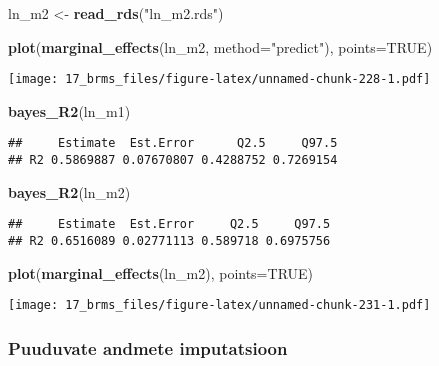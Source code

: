 \documentclass[]{article}
\newenvironment{Shaded}{\begin{snugshade}}{\end{snugshade}}
\newcommand{\KeywordTok}[1]{\textcolor[rgb]{0.13,0.29,0.53}{\textbf{#1}}}
\newcommand{\DataTypeTok}[1]{\textcolor[rgb]{0.13,0.29,0.53}{#1}}
\newcommand{\StringTok}[1]{\textcolor[rgb]{0.31,0.60,0.02}{#1}}
\newcommand{\OtherTok}[1]{\textcolor[rgb]{0.56,0.35,0.01}{#1}}
\newcommand{\NormalTok}[1]{#1}
\begin{document}
\begin{Shaded}
\begin{Highlighting}[]
\NormalTok{ln_m2 <-}\StringTok{ }\KeywordTok{read_rds}\NormalTok{(}\StringTok{"ln_m2.rds"}\NormalTok{)}
\end{Highlighting}
\end{Shaded}

\begin{Shaded}
\begin{Highlighting}[]
\KeywordTok{plot}\NormalTok{(}\KeywordTok{marginal_effects}\NormalTok{(ln_m2, }\DataTypeTok{method=}\StringTok{"predict"}\NormalTok{), }\DataTypeTok{points=}\OtherTok{TRUE}\NormalTok{)}
\end{Highlighting}
\end{Shaded}

\texttt{[image: 17\_brms\_files/figure-latex/unnamed-chunk-228-1.pdf]}

\begin{Shaded}
\begin{Highlighting}[]
\KeywordTok{bayes_R2}\NormalTok{(ln_m1)}
\end{Highlighting}
\end{Shaded}

\begin{verbatim}
##     Estimate  Est.Error      Q2.5     Q97.5
## R2 0.5869887 0.07670807 0.4288752 0.7269154
\end{verbatim}

\begin{Shaded}
\begin{Highlighting}[]
\KeywordTok{bayes_R2}\NormalTok{(ln_m2)}
\end{Highlighting}
\end{Shaded}

\begin{verbatim}
##     Estimate  Est.Error     Q2.5     Q97.5
## R2 0.6516089 0.02771113 0.589718 0.6975756
\end{verbatim}

\begin{Shaded}
\begin{Highlighting}[]
\KeywordTok{plot}\NormalTok{(}\KeywordTok{marginal_effects}\NormalTok{(ln_m2), }\DataTypeTok{points=}\OtherTok{TRUE}\NormalTok{)}
\end{Highlighting}
\end{Shaded}

\texttt{[image: 17\_brms\_files/figure-latex/unnamed-chunk-231-1.pdf]}

\subsubsection{Puuduvate andmete
imputatsioon}\label{puuduvate-andmete-imputatsioon}
\end{document}
